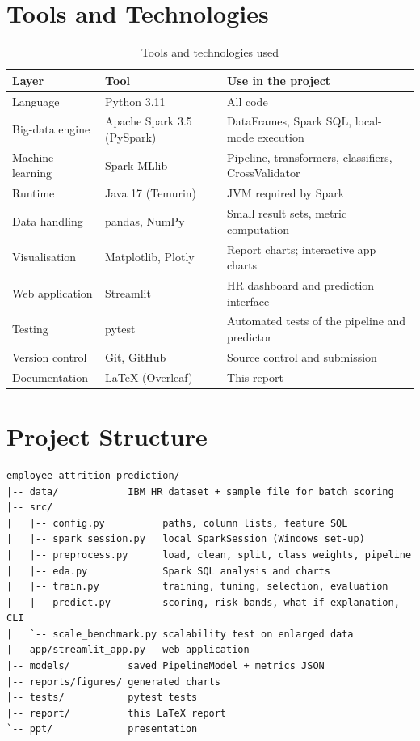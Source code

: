 \documentclass[12pt,a4paper]{report}
\begin{document}
\section{Tools and Technologies}

\begin{table}[H]
\centering
\caption{Tools and technologies used}
\label{tab:tools}
\small
\begin{tabularx}{\textwidth}{|P{3.6cm}|P{3.2cm}|L|}
\hline
\textbf{Layer} & \textbf{Tool} & \textbf{Use in the project} \\ \hline
Language & Python 3.11 & All code \\ \hline
Big-data engine & Apache Spark 3.5 (PySpark) & DataFrames, Spark SQL, local-mode execution \\ \hline
Machine learning & Spark MLlib & Pipeline, transformers, classifiers, CrossValidator \\ \hline
Runtime & Java 17 (Temurin) & JVM required by Spark \\ \hline
Data handling & pandas, NumPy & Small result sets, metric computation \\ \hline
Visualisation & Matplotlib, Plotly & Report charts; interactive app charts \\ \hline
Web application & Streamlit & HR dashboard and prediction interface \\ \hline
Testing & pytest & Automated tests of the pipeline and predictor \\ \hline
Version control & Git, GitHub & Source control and submission \\ \hline
Documentation & \LaTeX{} (Overleaf) & This report \\ \hline
\end{tabularx}
\end{table}

\section{Project Structure}

\begin{lstlisting}
employee-attrition-prediction/
|-- data/            IBM HR dataset + sample file for batch scoring
|-- src/
|   |-- config.py          paths, column lists, feature SQL
|   |-- spark_session.py   local SparkSession (Windows set-up)
|   |-- preprocess.py      load, clean, split, class weights, pipeline
|   |-- eda.py             Spark SQL analysis and charts
|   |-- train.py           training, tuning, selection, evaluation
|   |-- predict.py         scoring, risk bands, what-if explanation, CLI
|   `-- scale_benchmark.py scalability test on enlarged data
|-- app/streamlit_app.py   web application
|-- models/          saved PipelineModel + metrics JSON
|-- reports/figures/ generated charts
|-- tests/           pytest tests
|-- report/          this LaTeX report
`-- ppt/             presentation
\end{lstlisting}
\end{document}

